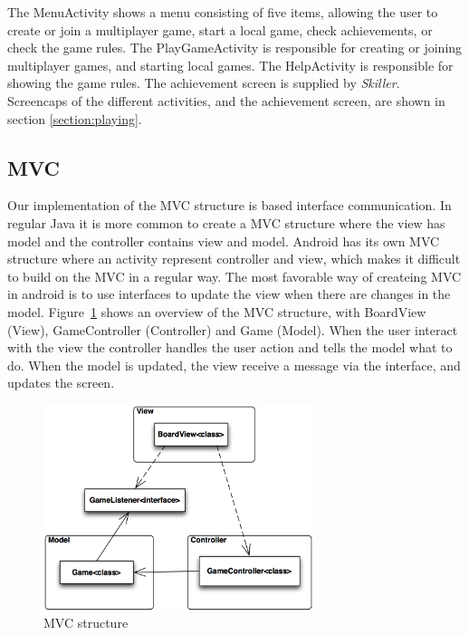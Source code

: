 The MenuActivity shows a menu consisting of five items, allowing the user to create or join a multiplayer game, start a local game, check achievements, or check the game rules. The PlayGameActivity is responsible for creating or joining multiplayer games, and starting local games. The HelpActivity is responsible for showing the game rules. The achievement screen is supplied by \emph{Skiller}.\\

Screencaps of the different activities, and the achievement screen, are shown in section \ref{section:playing}.

\subsection{MVC}

Our implementation of the MVC structure is based interface communication. In regular Java it is more common to create a MVC structure where the view has model and the controller contains view and model. Android has its own MVC structure where an activity represent controller and view, which makes it difficult to build on the MVC in a regular way. The most favorable way of createing MVC in android is to use interfaces to update the view when there are changes in the model. Figure~\ref{fig:mvc} shows an overview of the MVC structure, with BoardView (View), GameController (Controller) and Game (Model). When the user interact with the view the controller handles the user action and tells the model what to do. When the model is updated, the view receive a message via the interface, and updates the screen.

\begin{figure}[H]
\begin{center}
\includegraphics[width=0.7\textwidth]{Images/mvc}
\caption{MVC structure}
\label{fig:mvc}
\end{center}
\end{figure}

